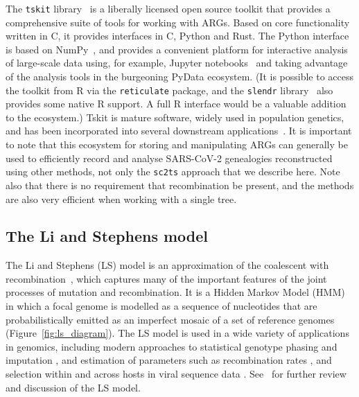 \documentclass{article}
\begin{document}
The \texttt{tskit} library~\citep{Tskit2023-tskit} is a liberally
licensed open source toolkit that provides a comprehensive suite
of tools for working with ARGs. Based on core functionality written
in C, it provides interfaces in C, Python and Rust. The Python interface
is based on NumPy~\citep{Harris2020-array}, and provides a convenient
platform for interactive analysis of large-scale data using, for
example, Jupyter notebooks~\citep{Kluyver2016-jupyter} and taking
advantage of the analysis tools in the burgeoning PyData ecosystem.
(It is possible to access the toolkit from R via the \texttt{reticulate}
package, and the \texttt{slendr} library~\citep{Petr2022-slendr}
also provides some native R support. A full R interface would be a
valuable addition to the ecosystem.)
Tskit is mature software, widely used in population genetics, and
has been incorporated into several downstream
applications~\citep[e.g.,][]{Haller2019-slim,Speidel2019-yh,
Terasaki2021-geonomics,
Fan2022-genealogical,Korfmann2022-weak,
Mahmoudi2022-bayesian,Petr2022-slendr,Rasmussen2022-espalier,
Zhang2023-lf}.
It is important to note that
this ecosystem for storing and manipulating ARGs can
generally be used to efficiently record and analyse SARS-CoV-2 genealogies reconstructed
using other methods, not only the \texttt{sc2ts} approach that we describe here.
Note also that there is no requirement that recombination be present,
and the methods are also very efficient when working with a single tree.

\subsection{The Li and Stephens model}
\label{sec:ls}
The Li and Stephens (LS) model \citep{Li2003-ib} is an approximation of the
coalescent with recombination~\citep{Hudson1983-properties}, which captures
many of the important features of the joint processes of mutation and
recombination. It is a Hidden Markov Model (HMM) in which a focal genome
is modelled as a
sequence of nucleotides that are probabilistically emitted as
an imperfect mosaic of a set of reference genomes
(Figure~\ref{fig:ls_diagram}).
The LS model is used in a wide variety
of applications in genomics, including modern approaches to
statistical genotype phasing and imputation
\citep{Delaneau2019-wl,Browning2021-cg,Browning2018-nk,Rubinacci2020-pa},
and estimation of parameters such as
recombination rates \citep[e.g.,][]{Hinch2011-tz},
and selection within and across hosts in viral
sequence data \citep[e.g.,][]{Palmer2019-wa}.
See~\cite{Mcvean2019-linkage} for further review and discussion
of the LS model.
\end{document}

